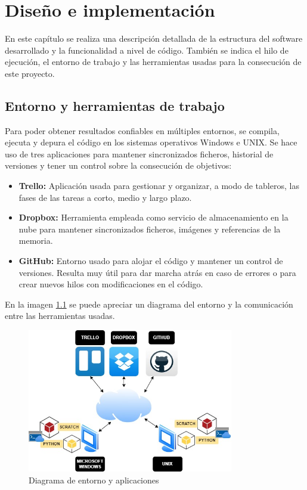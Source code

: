 \documentclass[a4paper, 12pt]{book}
\begin{document}

\cleardoublepage
\chapter{Diseño e implementación}

En este capítulo se realiza una descripción detallada de la estructura del software desarrollado y la funcionalidad a nivel de código. También se indica el hilo de ejecución, el entorno de trabajo y las herramientas usadas para la consecución de este proyecto.

\section{Entorno y herramientas de trabajo} 
\label{sec:entorno}

Para poder obtener resultados confiables en múltiples entornos, se compila, ejecuta y depura el código en los sistemas operativos Windows e UNIX. Se hace uso de tres aplicaciones para mantener sincronizados ficheros, historial de versiones y tener un control sobre la consecución de objetivos:

\begin{itemize}
  \item \textbf{Trello:} Aplicación usada para gestionar y organizar, a modo de tableros, las fases de las tareas a corto, medio y largo plazo. 
  \item \textbf{Dropbox:} Herramienta empleada como servicio de almacenamiento en la nube para mantener sincronizados ficheros, imágenes y referencias de la memoria.
  \item \textbf{GitHub:} Entorno usado para alojar el código y mantener un control de versiones. Resulta muy útil para dar marcha atrás en caso de errores o para crear nuevos hilos con modificaciones en el código.
\end{itemize}

En la imagen \ref{fig:diagrama_trabajo} se puede apreciar un diagrama del entorno y la comunicación entre las herramientas usadas.

 \begin{figure}[!h]
    \centering
    \includegraphics[width=9cm, keepaspectratio]{img/workplace.jpg}
    \caption{Diagrama de entorno y aplicaciones}
    \label{fig:diagrama_trabajo}
 \end{figure}
\end{document}

